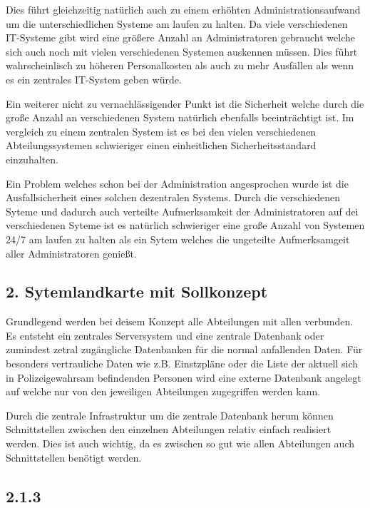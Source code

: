 \documentclass[12pt,utf8]{scrartcl}
\begin{document}
Dies führt gleichzeitig natürlich auch zu einem erhöhten Administrationsaufwand um die unterschiedlichen Systeme am laufen zu halten. Da viele verschiedenen IT-Systeme gibt wird eine größere Anzahl an Administratoren gebraucht welche sich auch noch  mit vielen verschiedenen Systemen auskennen müssen. Dies führt wahrscheinlisch zu höheren Personalkosten als auch zu mehr Ausfällen als wenn es ein zentrales IT-System geben würde.

Ein weiterer nicht zu vernachlässigender Punkt ist die Sicherheit welche durch die große Anzahl an verschiedenen System natürlich ebenfalls beeinträchtigt ist. Im vergleich zu einem zentralen System ist es bei den vielen verschiedenen Abteilungssystemen schwieriger einen einheitlichen Sicherheitsstandard einzuhalten.

Ein Problem welches schon bei der Administration angesprochen wurde ist die Ausfallsicherheit eines solchen dezentralen Systems. Durch die verschiedenen Syteme und dadurch auch verteilte Aufmerksamkeit der Administratoren auf dei verschiedenen Syteme ist es natürlich schwieriger eine große Anzahl von Systemen 24/7 am laufen zu halten als ein Sytem welches die ungeteilte Aufmerksamgeit aller Administratoren genießt.


\subsection*{\label{sub:thema}2. Sytemlandkarte mit Sollkonzept}

Grundlegend werden bei deisem Konzept alle Abteilungen mit allen verbunden. Es entsteht ein zentrales Serversystem und eine zentrale Datenbank oder zumindest zetral zugängliche Datenbanken für die normal anfallenden Daten. Für besonders vertrauliche Daten wie z.B. Einstzpläne oder die Liste der aktuell sich in Polizeigewahrsam befindenden Personen wird eine externe Datenbank angelegt auf welche nur von den jeweiligen Abteilungen zugegriffen werden kann.

Durch die zentrale Infrastruktur um die zentrale Datenbank herum können Schnittstellen zwischen den einzelnen Abteilungen relativ einfach realisiert werden. Dies ist auch wichtig, da es zwischen so gut wie allen Abteilungen auch Schnittstellen benötigt werden. 






\subsection*{2.1.3}\label{Aufgabe 2.1.3}
\end{document}
